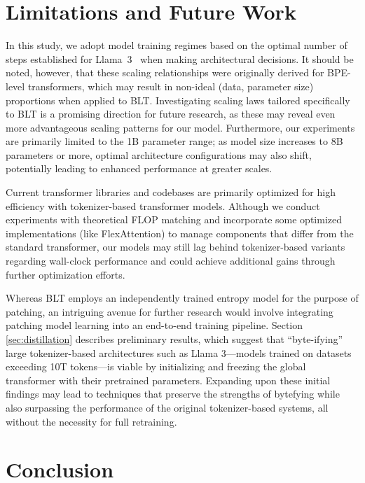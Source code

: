 \section{Limitations and Future Work}

In this study, we adopt model training regimes based on the optimal number of steps established for Llama~3~\citep{dubey2024llama} when making architectural decisions. It should be noted, however, that these scaling relationships were originally derived for BPE-level transformers, which may result in non-ideal (data, parameter size) proportions when applied to {\textsc BLT}. Investigating scaling laws tailored specifically to {\textsc BLT} is a promising direction for future research, as these may reveal even more advantageous scaling patterns for our model. Furthermore, our experiments are primarily limited to the 1B parameter range; as model size increases to 8B parameters or more, optimal architecture configurations may also shift, potentially leading to enhanced performance at greater scales.

Current transformer libraries and codebases are primarily optimized for high efficiency with tokenizer-based transformer models. Although we conduct experiments with theoretical FLOP matching and incorporate some optimized implementations (like FlexAttention) to manage components that differ from the standard transformer, our models may still lag behind tokenizer-based variants regarding wall-clock performance and could achieve additional gains through further optimization efforts.

Whereas {\textsc BLT} employs an independently trained entropy model for the purpose of patching, an intriguing avenue for further research would involve integrating patching model learning into an end-to-end training pipeline. Section \ref{sec:distillation} describes preliminary results, which suggest that ``byte-ifying'' large tokenizer-based architectures such as Llama 3—models trained on datasets exceeding 10T tokens—is viable by initializing and freezing the global transformer with their pretrained parameters. Expanding upon these initial findings may lead to techniques that preserve the strengths of bytefying while also surpassing the performance of the original tokenizer-based systems, all without the necessity for full retraining.

\section{Conclusion}
\label{section:conclusion}

